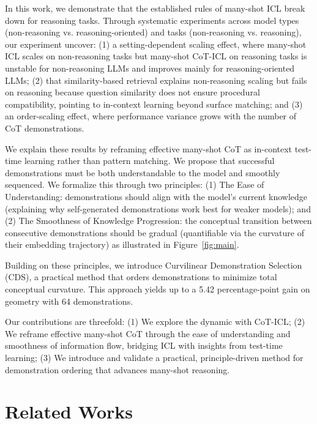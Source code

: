 \documentclass{article}
\theoremstyle{plain}
\theoremstyle{definition}
\theoremstyle{remark}
\begin{document}
In this work, we demonstrate that the established rules of many-shot ICL break down for reasoning tasks. Through systematic experiments across model types (non-reasoning vs. reasoning-oriented) and tasks (non-reasoning vs. reasoning), our experiment uncover: (1) a setting-dependent scaling effect, where many-shot ICL scales on non-reasoning tasks but many-shot CoT-ICL on reasoning tasks is unstable for non-reasoning LLMs and improves mainly for reasoning-oriented LLMs; (2) that similarity-based retrieval explains non-reasoning scaling but fails on reasoning because question similarity does not ensure procedural compatibility, pointing to in-context learning beyond surface matching; and (3) an order-scaling effect, where performance variance grows with the number of CoT demonstrations.

We explain these results by reframing effective many-shot CoT as in-context test-time learning rather than pattern matching. We propose that successful demonstrations must be both understandable to the model and smoothly sequenced. We formalize this through two principles: (1) The Ease of Understanding: demonstrations should align with the model's current knowledge (explaining why self-generated demonstrations work best for weaker models); and (2) The Smoothness of Knowledge Progression: the conceptual transition between consecutive demonstrations should be gradual (quantifiable via the curvature of their embedding trajectory) as illustrated in Figure~\ref{fig:main}.

Building on these principles, we introduce Curvilinear Demonstration Selection (CDS), a practical method that orders demonstrations to minimize total conceptual curvature. This approach yields up to a 5.42 percentage-point gain on geometry with 64 demonstrations.

Our contributions are threefold: (1) We explore the dynamic with CoT-ICL; (2) We reframe effective many-shot CoT through the ease of understanding and smoothness of information flow, bridging ICL with insights from test-time learning; (3) We introduce and validate a practical, principle-driven method for demonstration ordering that advances many-shot reasoning.




\section{Related Works}
\end{document}
